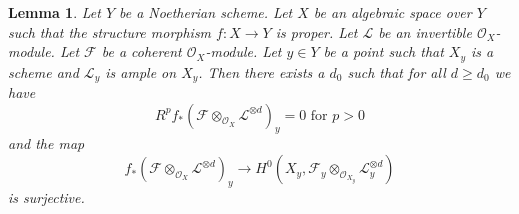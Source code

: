 \documentclass[10pt,a4paper]{amsart}
\theoremstyle{plain}
\newtheorem{lemma}[subsection]{Lemma}
\theoremstyle{definition}
\theoremstyle{remark}
\numberwithin{equation}{subsection}
\begin{document}
\begin{lemma}
\label{lemma-ample-on-fibre}
Let $Y$ be a Noetherian scheme. Let $X$ be an algebraic space over $Y$
such that the structure morphism $f : X \to Y$ is proper.
Let $\mathcal{L}$ be an invertible $\mathcal{O}_X$-module.
Let $\mathcal{F}$ be a coherent $\mathcal{O}_X$-module.
Let $y \in Y$ be a point such that $X_y$ is a scheme and
$\mathcal{L}_y$ is ample on $X_y$.
Then there exists a $d_0$ such that for all $d \geq d_0$ we have
$$
R^pf_*(\mathcal{F} \otimes_{\mathcal{O}_X} \mathcal{L}^{\otimes d})_y = 0
\text{ for }p > 0
$$
and the map
$$
f_*(\mathcal{F} \otimes_{\mathcal{O}_X} \mathcal{L}^{\otimes d})_y
\longrightarrow
H^0(X_y, \mathcal{F}_y \otimes_{\mathcal{O}_{X_y}} \mathcal{L}_y^{\otimes d})
$$
is surjective.
\end{lemma}
\end{document}
